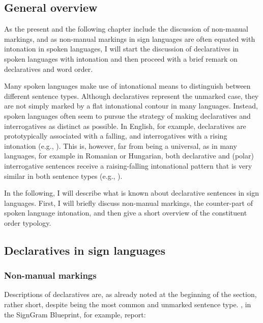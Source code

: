 \subsection{General overview}
As the present and the following chapter include the discussion of non-manual markings, and as non-manual markings in sign languages are often equated with intonation in spoken languages, I will start the discussion of declaratives in spoken languages with intonation and then proceed with a brief remark on declaratives and word order.

Many spoken languages make use of intonational means to distinguish between different sentence types. Although declaratives represent the unmarked case, they are not simply marked by a flat intonational contour in many languages. Instead, spoken languages often seem to pursue the strategy of making declaratives and interrogatives as distinct as possible. In English, for example, declaratives are prototypically associated with a falling, and interrogatives with a rising intonation (e.g., \citealt{gunlogson2002declarative}). This is, however, far from being a universal, as in many languages, for example in Romanian or Hungarian, both declarative and (polar) interrogative sentences receive a raising-falling intonational pattern that is very similar in both sentence types (e.g., \citealt{ladd1981intonational}).


In the following, I will describe what is known about declarative sentences in sign languages. First, I will briefly discuss non-manual markings, the counter-part of spoken language intonation, and then give a short overview of the constituent order typology. 

\subsection{Declaratives in sign languages}
\subsubsection{Non-manual markings}
Descriptions of declaratives are, as already noted at the beginning of the section, rather short, despite being the most common and unmarked sentence type. \citet[289]{signgram2017}, in the SignGram Blueprint, for example, report:

